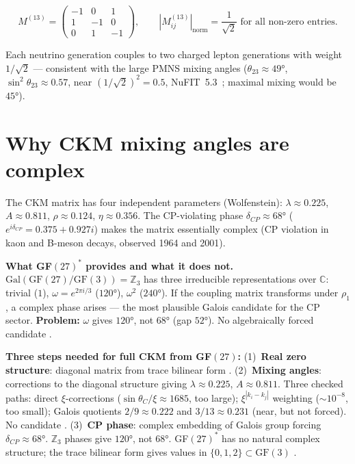 \begin{theorem}
\[
  M^{(13)}=\begin{pmatrix}-1&0&1\\1&-1&0\\0&1&-1\end{pmatrix},
  \qquad |M^{(13)}_{ij}|_\mathrm{norm}=\frac{1}{\sqrt{2}}
  \text{ for all non-zero entries.}
\]
\end{theorem}

Each neutrino generation couples to two charged lepton generations with weight
$1/\sqrt{2}$ --- consistent with the large PMNS mixing angles
($\theta_{23}\approx49°$, $\sin^2\theta_{23}\approx0.57$, near $(1/\sqrt{2})^2=0.5$, NuFIT~5.3~\cite{NuFIT53}; maximal mixing would be $45°$). \SM

\section{Why CKM mixing angles are complex}

The CKM matrix has four independent parameters (Wolfenstein):
$\lambda\approx0.225$, $A\approx0.811$, $\rho\approx0.124$, $\eta\approx0.356$.
The CP-violating phase $\delta_{CP}\approx68°$ ($e^{i\delta_{CP}}=0.375+0.927i$)
makes the matrix essentially complex (CP violation in kaon and B-meson decays,
observed 1964 and 2001).

\textbf{What GF$(27)^*$ provides and what it does not.}
$\mathrm{Gal}(\mathrm{GF}(27)/\mathrm{GF}(3))=\mathbb{Z}_3$ has three irreducible
representations over $\mathbb{C}$: trivial ($1$), $\omega=e^{2\pi i/3}$ ($120°$),
$\omega^2$ ($240°$). If the coupling matrix transforms under $\rho_1$, a complex
phase arises --- the most plausible Galois candidate for the CP sector.
\textbf{Problem:} $\omega$ gives $120°$, not $68°$ (gap $52°$). No algebraically
forced candidate \SM.

\textbf{Three steps needed for full CKM from GF$(27)$:}
(1)~\textbf{Real zero structure}: diagonal matrix from trace bilinear form \BM.
(2)~\textbf{Mixing angles}: corrections to the diagonal structure giving $\lambda\approx0.225$,
$A\approx0.811$. Three checked paths: direct $\xi$-corrections ($\sin\theta_C/\xi\approx1685$,
too large); $\xi^{|k_i-k_j|}$ weighting ($\sim10^{-8}$, too small); Galois quotients
$2/9\approx0.222$ and $3/13\approx0.231$ (near, but not forced). No candidate \SM.
(3)~\textbf{CP phase}: complex embedding of Galois group forcing $\delta_{CP}\approx68°$.
$\mathbb{Z}_3$ phases give $120°$, not $68°$. GF$(27)^*$ has no natural complex
structure; the trace bilinear form gives values in $\{0,1,2\}\subset\mathrm{GF}(3)$ \SM.

